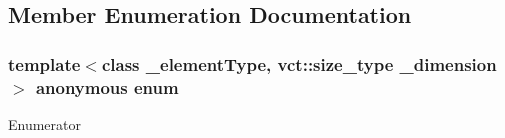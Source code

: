 \subsection{Member Enumeration Documentation}
\hypertarget{classvct_dynamic_n_array_ref_a92161a3e7a42576d3442eaf7bae097c1}{\subsubsection[{anonymous enum}]{\setlength{\rightskip}{0pt plus 5cm}template$<$class \-\_\-element\-Type, vct\-::size\-\_\-type \-\_\-dimension$>$ anonymous enum}}\label{classvct_dynamic_n_array_ref_a92161a3e7a42576d3442eaf7bae097c1}
\begin{Desc}
\item[Enumerator]\par
\begin{description}
\item[{\em 
\hypertarget{classvct_dynamic_n_array_ref_a92161a3e7a42576d3442eaf7bae097c1aa639cdab72a595c9cb324af98946bab5}{D\-I\-M\-E\-N\-S\-I\-O\-N}\label{classvct_dynamic_n_array_ref_a92161a3e7a42576d3442eaf7bae097c1aa639cdab72a595c9cb324af98946bab5}
}]\end{description}
\end{Desc}


